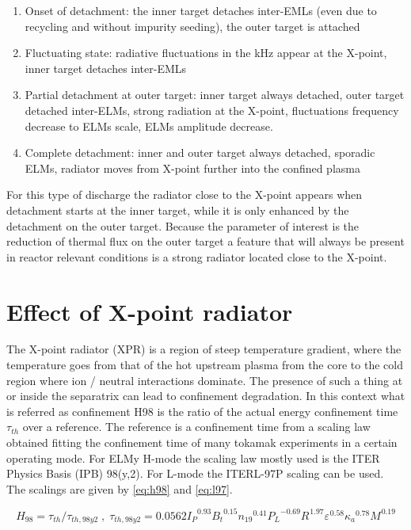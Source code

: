 \begin{enumerate}
    \item Onset of detachment: the inner target detaches inter-EMLs (even due to recycling and without impurity seeding), the outer target is attached
    \item Fluctuating state: radiative fluctuations in the kHz appear at the X-point, inner target detaches inter-EMLs
    \item Partial detachment at outer target: inner target always detached, outer target detached inter-ELMs, strong radiation at the X-point, fluctuations frequency decrease to ELMs scale, ELMs amplitude decrease.
    \item Complete detachment: inner and outer target always detached, sporadic ELMs, radiator moves from X-point further into the confined plasma
\end{enumerate}

For this type of discharge the radiator close to the X-point appears when detachment starts at the inner target, while it is only enhanced by the detachment on the outer target. Because the parameter of interest is the reduction of thermal flux on the outer target a feature that will always be present in reactor relevant conditions is a strong radiator located close to the X-point.

\section{Effect of X-point radiator}


The X-point radiator (XPR) is a region of steep temperature gradient, where the temperature goes from that of the hot upstream plasma from the core to the cold region where ion / neutral interactions dominate. The presence of such a thing at or inside the separatrix can lead to confinement degradation. In this context what is referred as confinement H98 is the ratio of the actual energy confinement time $\tau_{th}$ over a reference. The reference is a confinement time from a scaling law obtained fitting the confinement time of many tokamak experiments in a certain operating mode. For ELMy H-mode the scaling law mostly used is the ITER Physics Basis (IPB) 98(y,2).\cite{Doyle2007} For L-mode the ITERL-97P scaling can be used. \cite{Kaye1997} The scalings are given by \autoref{eq:h98} and \ref{eq:l97}.


\begin{equation}
{ H }_{ 98 }={\tau }_{ th }/{\tau }_{ th,98y2 } \; , \; {\tau }_{ th,98y2 }=0.0562 {{ I }_{ P }}^{ 0.93} {{ B }_{ t }}^{ 0.15} {{ n }_{ 19 }}^{ 0.41} {{ P }_{ L }}^{ -0.69} {{ R }_{  }}^{ 1.97} {{ \varepsilon  }_{  }}^{ 0.58} {{ \kappa  }_{ a }}^{ 0.78} {{ M }_{  }}^{ 0.19}
\label{eq:h98}
\end{equation}

